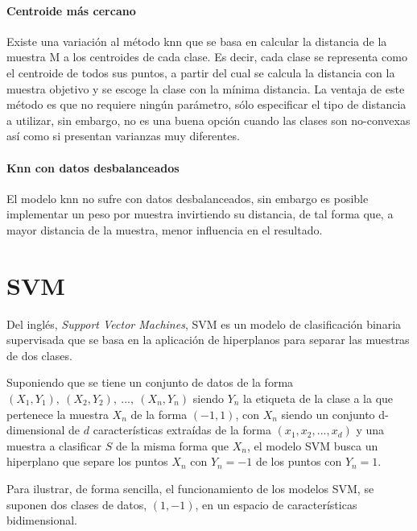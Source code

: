 \paragraph{Centroide más cercano} Existe una variación al método knn que se basa en calcular la distancia de la muestra M a los centroides de cada clase. Es decir, cada clase se representa como el centroide de todos sus puntos, a partir del cual se calcula la distancia con la muestra objetivo y se escoge la clase con la mínima distancia. La ventaja de este método es que no requiere ningún parámetro, sólo especificar el tipo de distancia a utilizar, sin embargo, no es una buena opción cuando las clases son no-convexas así como si presentan varianzas muy diferentes.

\paragraph{Knn con datos desbalanceados} El modelo knn no sufre con datos desbalanceados, sin embargo es posible implementar un peso por muestra invirtiendo su distancia, de tal forma que, a mayor distancia de la muestra,  menor influencia en el resultado.
\section{SVM}

Del inglés, \textit{Support Vector Machines}, SVM es un modelo de clasificación binaria supervisada que se basa en la aplicación de hiperplanos para separar las muestras de dos clases.

Suponiendo que se tiene un conjunto de datos de la forma $\left(X_{1},Y_{1}\right),\:\left(X_{2},Y_{2}\right),\:...,\:\left(X_{n},Y_{n}\right)$ siendo $Y_{n}$ la etiqueta de la clase a la que pertenece la muestra $X_{n}$ de la forma $\left(-1,1\right)$, con $X_{n}$ siendo un conjunto d-dimensional de $d$ características extraídas de la forma $\left(x_{1},x_{2},...,x_{d}\right)$ y una muestra a clasificar $S$ de la misma forma que $X_{n}$, el modelo SVM busca un hiperplano que separe los puntos $X_{n}$ con $Y_{n} = -1$ de los puntos con $Y_{n} = 1$.

Para ilustrar, de forma sencilla, el funcionamiento de los modelos SVM, se suponen dos clases de datos, $\left(1,-1\right)$, en un espacio de características bidimensional.

